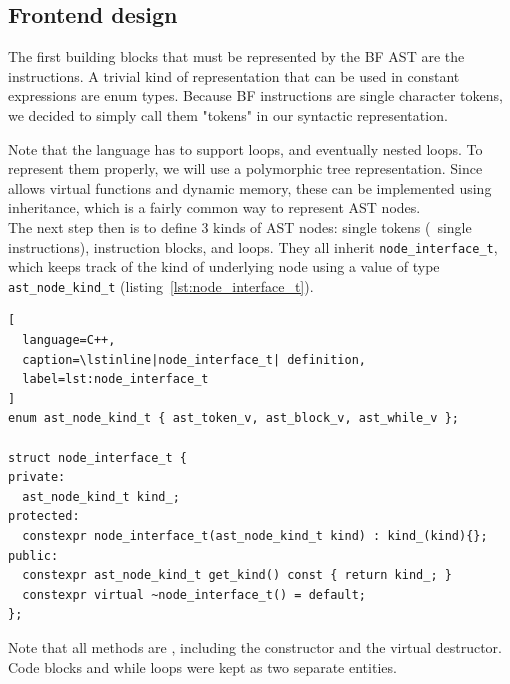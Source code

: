 \documentclass[../../main.tex]{subfiles}
\begin{document}

\subsection{Frontend design}

The first building blocks that must be represented by the BF AST are the
instructions. A trivial kind of representation that can be used in constant
expressions are enum types. Because BF instructions are single character tokens,
we decided to simply call them "tokens" in our syntactic representation.



Note that the language has to support loops, and eventually nested loops.
To represent them properly, we will use a polymorphic tree representation.
Since  allows virtual functions and dynamic memory, these can be
implemented using inheritance, which is a fairly common way to represent AST
nodes.\\

The next step then is to define 3 kinds of AST nodes: single tokens (\ie~single
instructions), instruction blocks, and loops. They all inherit
\lstinline|node_interface_t|, which keeps track of the kind of underlying node
using a value of type \lstinline|ast_node_kind_t|
(listing~\ref{lst:node_interface_t}).

\begin{lstlisting}[
  language=C++,
  caption=\lstinline|node_interface_t| definition,
  label=lst:node_interface_t
]
enum ast_node_kind_t { ast_token_v, ast_block_v, ast_while_v };

struct node_interface_t {
private:
  ast_node_kind_t kind_;
protected:
  constexpr node_interface_t(ast_node_kind_t kind) : kind_(kind){};
public:
  constexpr ast_node_kind_t get_kind() const { return kind_; }
  constexpr virtual ~node_interface_t() = default;
};
\end{lstlisting}

% 

Note that all methods are \constexpr, including the constructor and the virtual
destructor. Code blocks and while loops were kept as two separate entities.
\end{document}
